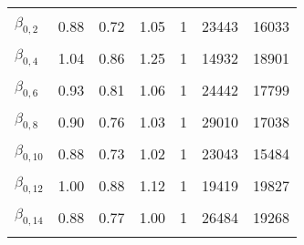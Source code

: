 \begin{longtable}[t]{lrrrrrr}
\endfoot
\bottomrule
\endlastfoot
\cellcolor{gray!6}{$\beta_{0, 1}$} & \cellcolor{gray!6}{0.96} & \cellcolor{gray!6}{0.83} & \cellcolor{gray!6}{1.09} & \cellcolor{gray!6}{1} & \cellcolor{gray!6}{23024} & \cellcolor{gray!6}{17665}\\
$\beta_{0, 2}$ & 0.88 & 0.72 & 1.05 & 1 & 23443 & 16033\\
\cellcolor{gray!6}{$\beta_{0, 3}$} & \cellcolor{gray!6}{0.79} & \cellcolor{gray!6}{0.63} & \cellcolor{gray!6}{0.93} & \cellcolor{gray!6}{1} & \cellcolor{gray!6}{14511} & \cellcolor{gray!6}{15038}\\
$\beta_{0, 4}$ & 1.04 & 0.86 & 1.25 & 1 & 14932 & 18901\\
\cellcolor{gray!6}{$\beta_{0, 5}$} & \cellcolor{gray!6}{0.99} & \cellcolor{gray!6}{0.85} & \cellcolor{gray!6}{1.13} & \cellcolor{gray!6}{1} & \cellcolor{gray!6}{19389} & \cellcolor{gray!6}{18920}\\
$\beta_{0, 6}$ & 0.93 & 0.81 & 1.06 & 1 & 24442 & 17799\\
\cellcolor{gray!6}{$\beta_{0, 7}$} & \cellcolor{gray!6}{0.77} & \cellcolor{gray!6}{0.55} & \cellcolor{gray!6}{0.96} & \cellcolor{gray!6}{1} & \cellcolor{gray!6}{12668} & \cellcolor{gray!6}{11859}\\
$\beta_{0, 8}$ & 0.90 & 0.76 & 1.03 & 1 & 29010 & 17038\\
\cellcolor{gray!6}{$\beta_{0, 9}$} & \cellcolor{gray!6}{0.77} & \cellcolor{gray!6}{0.57} & \cellcolor{gray!6}{0.94} & \cellcolor{gray!6}{1} & \cellcolor{gray!6}{12015} & \cellcolor{gray!6}{13107}\\
$\beta_{0, 10}$ & 0.88 & 0.73 & 1.02 & 1 & 23043 & 15484\\
\cellcolor{gray!6}{$\beta_{0, 11}$} & \cellcolor{gray!6}{0.91} & \cellcolor{gray!6}{0.76} & \cellcolor{gray!6}{1.06} & \cellcolor{gray!6}{1} & \cellcolor{gray!6}{24185} & \cellcolor{gray!6}{17149}\\
$\beta_{0, 12}$ & 1.00 & 0.88 & 1.12 & 1 & 19419 & 19827\\
\cellcolor{gray!6}{$\beta_{0, 13}$} & \cellcolor{gray!6}{0.96} & \cellcolor{gray!6}{0.83} & \cellcolor{gray!6}{1.10} & \cellcolor{gray!6}{1} & \cellcolor{gray!6}{21742} & \cellcolor{gray!6}{17949}\\
$\beta_{0, 14}$ & 0.88 & 0.77 & 1.00 & 1 & 26484 & 19268\\
\cellcolor{gray!6}{$\beta_{0, 15}$} & \cellcolor{gray!6}{0.88} & \cellcolor{gray!6}{0.73} & \cellcolor{gray!6}{1.04} & \cellcolor{gray!6}{1} & \cellcolor{gray!6}{24110} & \cellcolor{gray!6}{15964}\\

\end{longtable}
